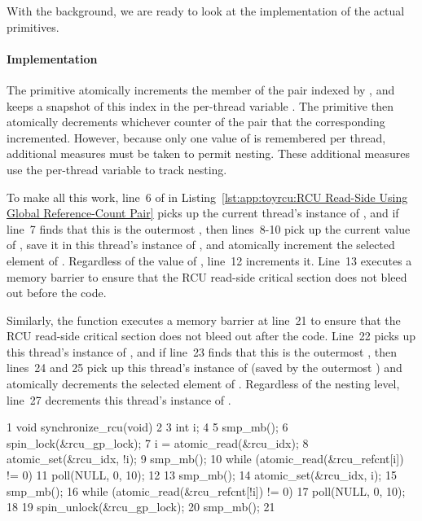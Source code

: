 With the background, we are ready to look at the implementation of the
actual primitives.

\paragraph{Implementation}

The  primitive atomically increments the member of the
 pair indexed by , and keeps a
snapshot of this index in the per-thread variable .
The  primitive then atomically decrements
whichever counter of the pair that the corresponding 
incremented.
However, because only one value of  is remembered per thread,
additional measures must be taken to permit nesting.
These additional measures use the per-thread  variable
to track nesting.

To make all this work, line~6 of  in
Listing~\ref{lst:app:toyrcu:RCU Read-Side Using Global Reference-Count Pair}
picks up the
current thread's instance of , and if line~7 finds
that this is the outermost ,
then lines~8-10 pick up the current value of
, save it in this thread's instance of ,
and atomically increment the selected element of .
Regardless of the value of , line~12 increments it.
Line~13 executes a memory barrier to ensure that the RCU read-side
critical section does not bleed out before the  code.

Similarly, the  function executes a memory barrier
at line~21
to ensure that the RCU read-side critical section does not bleed out
after the  code.
Line~22 picks up this thread's instance of , and if
line~23 finds that this is the outermost ,
then lines~24 and 25 pick up this thread's instance of 
(saved by the outermost ) and atomically decrements
the selected element of .
Regardless of the nesting level, line~27 decrements this thread's
instance of .

\begin{listing}[tbp]
{ \scriptsize
\begin{verbbox}
  1 void synchronize_rcu(void)
  2 {
  3   int i;
  4
  5   smp_mb();
  6   spin_lock(&rcu_gp_lock);
  7   i = atomic_read(&rcu_idx);
  8   atomic_set(&rcu_idx, !i);
  9   smp_mb();
 10   while (atomic_read(&rcu_refcnt[i]) != 0) {
 11     poll(NULL, 0, 10);
 12   }
 13   smp_mb();
 14   atomic_set(&rcu_idx, i);
 15   smp_mb();
 16   while (atomic_read(&rcu_refcnt[!i]) != 0) {
 17     poll(NULL, 0, 10);
 18   }
 19   spin_unlock(&rcu_gp_lock);
 20   smp_mb();
 21 }
\end{verbbox}
}
\centering
\theverbbox
\caption{RCU Update Using Global Reference-Count Pair}
\label{lst:app:toyrcu:RCU Update Using Global Reference-Count Pair}
\end{listing}

